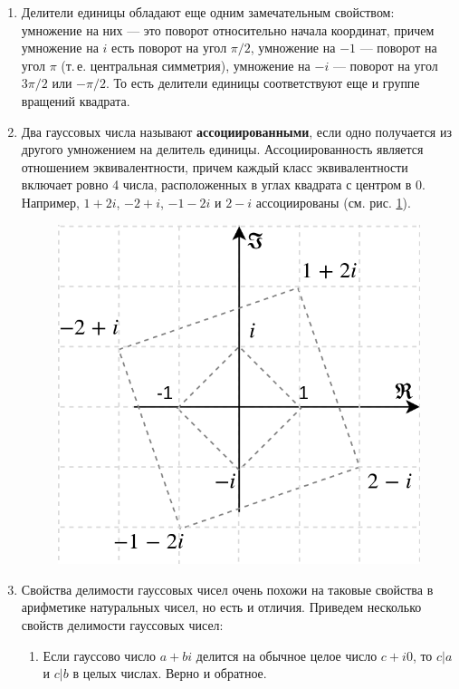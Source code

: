 \begin{enumerate}
\item Делители единицы обладают еще одним замечательным свойством: умножение на них --- это поворот относительно начала координат, причем умножение на $i$ есть поворот на угол $\pi/2$, умножение на $-1$ --- поворот на угол $\pi$ (т.\,е. центральная симметрия), умножение на $-i$ --- поворот на угол $3\pi/2$ или $-\pi/2$. То есть делители единицы соответствуют еще и группе вращений квадрата.


\item Два гауссовых числа называют \textbf{ассоциированными}, если одно получается из другого умножением на делитель единицы. Ассоциированность является отношением эквивалентности, причем каждый класс эквивалентности включает ровно 4 числа, расположенных в углах квадрата с центром в 0. Например, $1+2i$, $-2+i$, $-1-2i$ и $2-i$ ассоциированы (см. рис. \ref{Gaussian}).

\begin{figure}[hbt!]
\begin{center}
\includegraphics[scale=0.35]{Gaussian.png}
\end{center}\caption{}\label{Gaussian}
\end{figure}

\item Свойства делимости гауссовых чисел очень похожи на таковые свойства в арифметике натуральных чисел, но есть и отличия. Приведем несколько свойств делимости гауссовых чисел:
\begin{enumerate}
\item \label{Div1}Если гауссово число $a+bi$ делится на обычное целое число $c+i0$, то $c|a$ и $c|b$ в целых числах. Верно и обратное.


\end{enumerate}
\end{enumerate}
